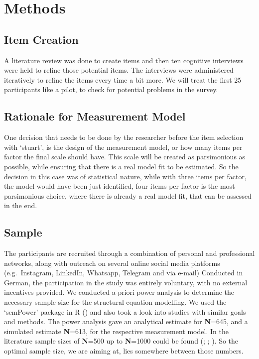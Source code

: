 \documentclass[
  12pt,
  a4paper,
  twoside]{article}
\begin{document}
\section{Methods}\label{methods}

\subsection{Item Creation}\label{item-creation}

A literature review was done to create items and then ten cognitive interviews were held to refine those potential items. The interviews were administered iteratively to refine the items every time a bit more. We will treat the first 25 participants like a pilot, to check for potential problems in the survey.

\subsection{Rationale for Measurement Model}\label{rationale-for-measurement-model}

One decision that needs to be done by the researcher before the item selection with `stuart', is the design of the measurement model, or how many items per factor the final scale should have.
This scale will be created as parsimonious as possible, while ensuring that there is a real model fit to be estimated. So the decision in this case was of statistical nature, while with three items per factor, the model would have been just identified, four items per factor is the most parsimonious choice, where there is already a real model fit, that can be assessed in the end.

\subsection{Sample}\label{sample}

The participants are recruited through a combination of personal and professional networks, along with outreach on several online social media platforms (e.g.~Instagram, LinkedIn, Whatsapp, Telegram and via e-mail) Conducted in German, the participation in the study was entirely voluntary, with no external incentives provided. We conducted a-priori power analysis to determine the necessary sample size for the structural equation modelling. We used the `semPower' package in R () and also took a look into studies with similar goals and methods. The power analysis gave an analytical estimate for \textbf{N}=645, and a simulated estimate \textbf{N}=613, for the respective measurement model. In the literature sample sizes of \textbf{N}=500 up to \textbf{N}=1000 could be found (; ; ). So the optimal sample size, we are aiming at, lies somewhere between those numbers.
\end{document}
